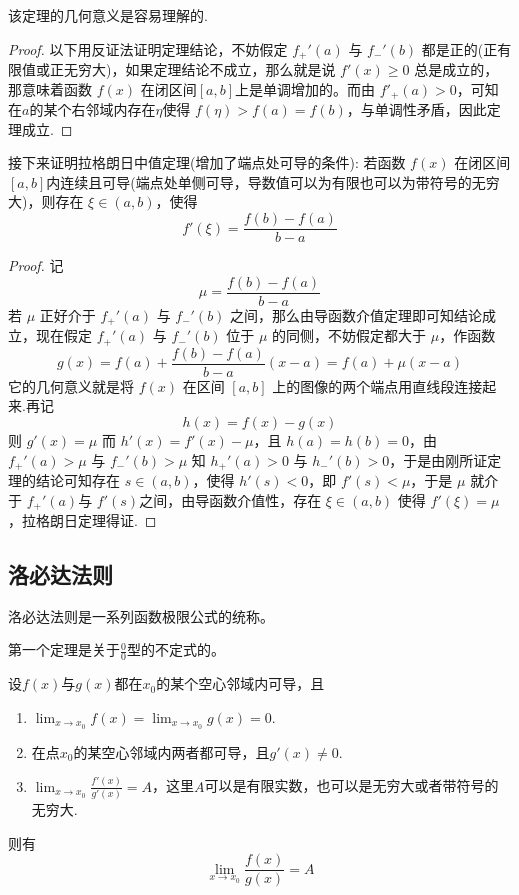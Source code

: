 该定理的几何意义是容易理解的.

\begin{proof}
 以下用反证法证明定理结论，不妨假定 $f_{+}'(a)$ 与 $f_-'(b)$ 都是正的(正有限值或正无穷大)，如果定理结论不成立，那么就是说 $f'(x) \geqslant 0$ 总是成立的，那意味着函数 $f(x)$ 在闭区间$[a,b]$上是单调增加的。而由 $f'_{+}(a) >0$，可知在$a$的某个右邻域内存在$\eta$使得 $f(\eta)>f(a)=f(b)$，与单调性矛盾，因此定理成立. 
\end{proof}

接下来证明拉格朗日中值定理(增加了端点处可导的条件): 若函数 $f(x)$ 在闭区间$[a,b]$内连续且可导(端点处单侧可导，导数值可以为有限也可以为带符号的无穷大)，则存在 $\xi \in (a,b)$，使得
\[ f'(\xi) = \frac{f(b)-f(a)}{b-a} \]
\begin{proof}
  记
\[ \mu = \frac{f(b)-f(a)}{b-a} \]
若 $\mu$ 正好介于 $f_{+}'(a)$ 与 $f_-'(b)$ 之间，那么由导函数介值定理即可知结论成立，现在假定 $f_{+}'(a)$ 与 $f_-'(b)$ 位于 $\mu$ 的同侧，不妨假定都大于 $\mu$，作函数
\[ g(x) = f(a) +  \frac{f(b)-f(a)}{b-a} (x-a) = f(a) + \mu (x-a) \]
它的几何意义就是将 $f(x)$ 在区间 $[a,b]$ 上的图像的两个端点用直线段连接起来.再记
\[ h(x) = f(x) - g(x) \]
则 $g'(x) = \mu$ 而 $h'(x) = f'(x) - \mu$，且 $h(a)=h(b)=0$，由 $f_{+}'(a)>\mu$ 与 $f_-'(b)>\mu$ 知 $h_{+}'(a)>0$ 与 $h_-'(b)>0$，于是由刚所证定理的结论可知存在 $s \in (a,b)$，使得 $h'(s)<0$，即 $f'(s)<\mu$，于是 $\mu$ 就介于 $f_{+}'(a)$与 $f'(s)$之间，由导函数介值性，存在 $\xi \in (a,b)$ 使得 $f'(\xi) = \mu$，拉格朗日定理得证.
\end{proof}

\subsection{洛必达法则}
\label{sec:L'Hopital-rule}

洛必达法则是一系列函数极限公式的统称。

第一个定理是关于$\frac{0}{0}$型的不定式的。
\begin{theorem}
  设$f(x)$与$g(x)$都在$x_0$的某个空心邻域内可导，且
  \begin{enumerate}
  \item $\lim_{x \to x_0} f(x) = \lim_{x \to x_0} g(x) = 0$.
  \item 在点$x_0$的某空心邻域内两者都可导，且$g'(x) \neq 0$.
  \item $\lim_{x \to x_0} \frac{f'(x)}{g'(x)}=A$，这里$A$可以是有限实数，也可以是无穷大或者带符号的无穷大.
  \end{enumerate}
  则有
  \[ \lim_{x \to x_0} \frac{f(x)}{g(x)} = A \]
\end{theorem}

